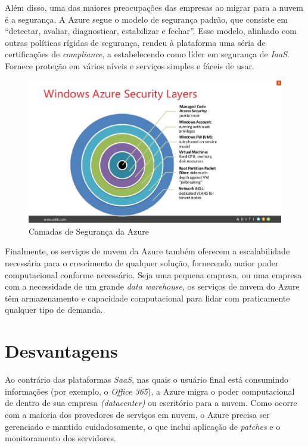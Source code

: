 Além disso, uma das maiores preocupações das empresas ao migrar para a nuvem é a segurança. A Azure segue o modelo de segurança padrão, que consiste em ``detectar, avaliar, diagnosticar, estabilizar e fechar''. Esse modelo, alinhado com outras políticas rígidas de segurança, rendeu à plataforma uma séria de certificações de \textit{compliance}, a estabelecendo como líder em segurança de \textit{IaaS}. Fornece proteção em vários níveis e serviços simples e fáceis de usar.


\begin{figure}[h!]
  \centering
  \includegraphics[scale=0.75]{imagens/azure-security.eps}
  \caption{Camadas de Segurança da Azure}
\end{figure}

\newpage

Finalmente, os serviços de nuvem da Azure também oferecem a escalabilidade necessária para o crescimento de qualquer solução, fornecendo maior poder computacional conforme necessário. Seja uma pequena empresa, ou uma empresa com a necessidade de um grande \textit{data warehouse}, os serviços de nuvem do Azure têm armazenamento e capacidade computacional para lidar com praticamente qualquer tipo de demanda.


 
\section{Desvantagens}

Ao contrário das plataformas \textit{SaaS}, nas quais o usuário final está consumindo informações (por exemplo, o \textit{Office 365}), a Azure migra o poder computacional de dentro de sua empresa \textit{(datacenter)} ou escritório para a nuvem. Como ocorre com a maioria dos provedores de serviços em nuvem, o Azure precisa ser gerenciado e mantido cuidadosamente, o que inclui aplicação de \textit{patches} e o monitoramento dos servidores.

